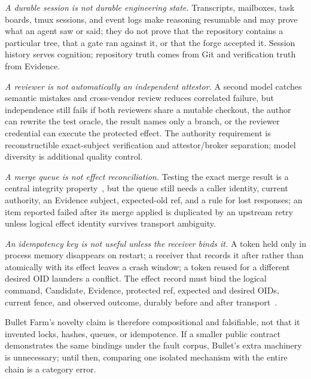 \documentclass[journal]{IEEEtran}
\begin{document}
\emph{A durable session is not durable engineering state.} Transcripts,
mailboxes, task boards, tmux sessions, and event logs make reasoning resumable
and may prove what an agent saw or said; they do not prove that the repository
contains a particular tree, that a gate ran against it, or that the forge
accepted it. Session history serves cognition; repository truth comes from
Git and verification truth from Evidence.

\emph{A reviewer is not automatically an independent attestor.} A second
model catches semantic mistakes and cross-vendor review reduces correlated
failure, but independence still fails if both reviewers share a mutable
checkout, the author can rewrite the test oracle, the result names only a
branch, or the reviewer credential can execute the protected effect. The
authority requirement is reconstructible exact-subject verification and
attestor/broker separation; model diversity is additional quality control.

\emph{A merge queue is not effect reconciliation.} Testing the exact merge
result is a central integrity property~\cite{borsRule,githubMergeQueue}, but
the queue still needs a caller identity, current authority, an Evidence
subject, expected-old ref, and a rule for lost responses; an item reported
failed after its merge applied is duplicated by an upstream retry unless
logical effect identity survives transport ambiguity.

\emph{An idempotency key is not useful unless the receiver binds it.} A token
held only in process memory disappears on restart; a receiver that records it
after rather than atomically with its effect leaves a crash window; a token
reused for a different desired OID launders a conflict. The effect record must
bind the logical command, Candidate, Evidence, protected ref, expected and
desired OIDs, current fence, and observed outcome, durably before and after
transport~\cite{helland2012}.

Bullet Farm's novelty claim is therefore compositional and falsifiable, not
that it invented locks, hashes, queues, or idempotence. If a smaller public
contract demonstrates the same bindings under the fault corpus, Bullet's extra
machinery is unnecessary; until then, comparing one isolated mechanism with
the entire chain is a category error.
\end{document}
